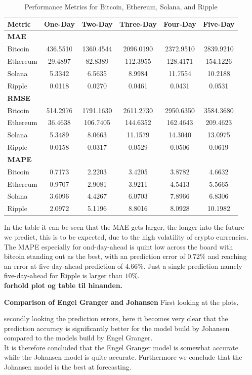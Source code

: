 \begin{table}[H]
\centering
\caption{Performance Metrics for Bitcoin, Ethereum, Solana, and Ripple}
\begin{tabular}{lccccc}
\toprule
\textbf{Metric} & \textbf{One-Day} & \textbf{Two-Day} & \textbf{Three-Day} & \textbf{Four-Day} & \textbf{Five-Day} \\
\midrule
\textbf{MAE} & & & & & \\
Bitcoin   & 436.5510 & 1360.4544 & 2096.0190 & 2372.9510 & 2839.9210 \\
Ethereum  &  29.4897 &   82.8389 &  112.3955 &  128.4171 &  154.1226 \\
Solana    &   5.3342 &    6.5635 &    8.9984 &   11.7554 &   10.2188 \\
Ripple    &   0.0118 &    0.0270 &    0.0461 &    0.0431 &    0.0531 \\
\midrule
\textbf{RMSE} & & & & & \\
Bitcoin   & 514.2976 & 1791.1630 & 2611.2730 & 2950.6350 & 3584.3680 \\
Ethereum  &  36.4638 &  106.7405 &  144.6352 &  162.4643 &  209.4623 \\
Solana    &   5.3489 &    8.0663 &   11.1579 &   14.3040 &   13.0975 \\
Ripple    &   0.0158 &    0.0317 &    0.0529 &    0.0506 &    0.0619 \\
\midrule
\textbf{MAPE} & & & & & \\
Bitcoin   &   0.7173 &    2.2203 &    3.4205 &    3.8782 &    4.6632 \\
Ethereum  &   0.9707 &    2.9081 &    3.9211 &    4.5413 &    5.5665 \\
Solana    &   3.6096 &    4.4267 &    6.0703 &    7.8966 &    6.8306 \\
Ripple    &   2.0972 &    5.1196 &    8.8016 &    8.0928 &   10.1982 \\
\bottomrule
\end{tabular}
\end{table}
\noindent In the table it can be seen that the MAE gets larger, the longer into the future we predict, this is to be expected, due to the high volatility of crypto currencies. The MAPE especially for ond-day-ahead is quint low across the board with bitcoin standing out as the best, with an prediction error of $0.72\%$ and reaching an error at five-day-ahead prediction of $4.66\%$. Just a single prediction namely five-day-ahead for Ripple is larger than $10\%$.\\
\textbf{forhold plot og table til hinanden.}

\textbf{Comparison of Engel Granger and Johansen}
First looking at the plots, 

secondly looking the prediction errors, here it becomes very clear that the prediction accuracy is significantly better for the model build by Johansen compared to the models build by Engel Granger.\\
It is therefore concluded that the Engel Granger model is somewhat accurate while the Johansen model is quite accurate. Furthermore we conclude that the Johansen model is the best at forecasting.